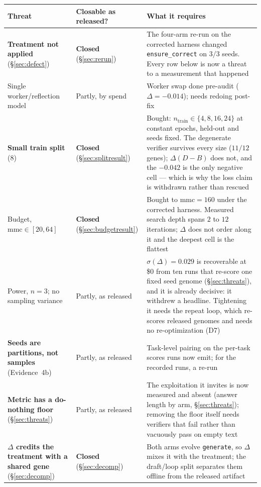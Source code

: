\documentclass[11pt]{article}
\newcommand{\dd}{\ensuremath{\Delta}}
\begin{document}
\begin{table}[h]
\centering
\small
\begin{tabular}{p{}p{}p{}}
\toprule
Threat & Closable as released? & What it requires \\
\midrule
\textbf{Treatment not applied} (\S\ref{sec:defect}) & \textbf{Closed} (\S\ref{sec:rerun}) &
  The four-arm re-run on the corrected harness changed \texttt{ensure\_correct} on $3/3$
  seeds. Every row below is now a threat to a measurement that happened \\
Single worker/reflection model & Partly, by spend & Worker swap done pre-audit
  ($\dd=-0.014$); needs redoing post-fix \\
\textbf{Small train split} ($8$) & \textbf{Closed} (\S\ref{sec:splitresult}) & Bought:
  $n_{\mathrm{train}} \in \{4,8,16,24\}$ at constant epochs, held-out and seeds fixed. The
  degenerate verifier survives every size ($11/12$ genes); $\dd(D-B)$ does not, and the
  $-0.042$ is the only negative cell --- which is why the loss claim is withdrawn rather than
  rescued \\
Budget, $\mathrm{mmc}\in[20,64]$ & \textbf{Closed} (\S\ref{sec:budgetresult}) & Bought to
  $\mathrm{mmc}{=}160$ under the corrected harness. Measured search depth spans $2$ to $12$
  iterations; $\dd$ does not order along it and the deepest cell is the flattest \\
Power, $n{=}3$; no sampling variance & Partly, as released & $\sigma(\dd) = 0.029$ is
  recoverable at \$0 from ten runs that re-score one fixed seed genome (\S\ref{sec:threats}),
  and it is already decisive: it withdrew a headline. Tightening it needs the repeat loop,
  which re-scores released genomes and needs no re-optimization (D7) \\
\textbf{Seeds are partitions, not samples} (Evidence~4b) & Partly, as released & Task-level
  pairing on the per-task scores runs now emit; for the recorded runs, a re-run \\
\textbf{Metric has a do-nothing floor} (\S\ref{sec:threats}) & Partly, as released &
  The exploitation it invites is now measured and absent (answer length by arm,
  \S\ref{sec:threats}); removing the floor itself needs verifiers that fail rather than
  vacuously pass on empty text \\
\textbf{$\dd$ credits the treatment with a shared gene} (\S\ref{sec:decomp}) & \textbf{Closed}
  (\S\ref{sec:decomp}) & Both arms evolve \texttt{generate}, so $\dd$ mixes it with the
  treatment; the draft/loop split separates them offline from the released artifact \\

\end{tabular}
\end{table}
\end{document}
